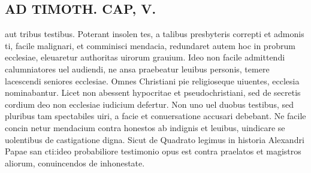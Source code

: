 \documentclass{article}
\begin{document}
\begin{pages}
\section*{AD TIMOTH. CAP, V. }
\marginpar{[ p.525 ]}\pstart aut tribus testibus. Poterant insolen tes, a talibus presbyteris correpti et admonis ti, facile malignari, et comminisci mendacia, redundaret autem hoc in probrum ecclesiae, eleuaretur authoritas uirorum grauium. Ideo non facile admittendi calumniatores uel audiendi, ne ansa praebeatur leuibus personis, temere lacescendi seniores ecclesiae. Omnes Christiani pie religioseque uiuentes, ecclesia nominabantur. Licet non abessent hypocritae et pseudochristiani, sed de secretis cordium deo non ecclesiae iudicium defertur. Non uno uel duobus testibus, sed pluribus tam spectabiles uiri, a facie et conuersatione accusari debebant. Ne facile concin netur mendacium contra honestos ab indignis et leuibus, uindicare se uolentibus de castigatione digna. Sicut de Quadrato legimus in historia Alexandri Papae san cti:ideo probabiliore testimonio opus est contra praelatos et magistros aliorum, conuincendos de inhonestate.  \pend
{}
{}

\end{pages}
\end{document}
